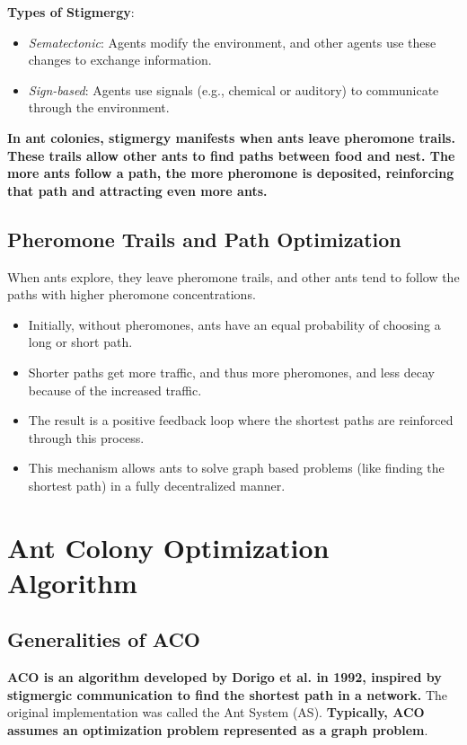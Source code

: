 \textbf{Types of Stigmergy}:
    \begin{itemize}
        \item \textit{Sematectonic}: Agents modify the environment, and other agents use these changes to exchange information.
        \item \textit{Sign-based}: Agents use signals (e.g., chemical or auditory) to communicate through the environment.
    \end{itemize}
    \textbf{In ant colonies, stigmergy manifests when ants leave pheromone trails. These trails allow other ants to find paths between food and nest. The more ants follow a path, the more pheromone is deposited, reinforcing that path and attracting even more ants.}

\subsection*{Pheromone Trails and Path Optimization}
When ants explore, they leave pheromone trails, and other ants tend to follow the paths with higher pheromone concentrations.
\begin{itemize}
    \item Initially, without pheromones, ants have an equal probability of choosing a long or short path.
    \item Shorter paths get more traffic, and thus more pheromones, and less decay because of the increased traffic.
    \item The result is a positive feedback loop where the shortest paths are reinforced through this process.
    \item This mechanism allows ants to solve graph based problems (like finding the shortest path) in a fully decentralized manner.
\end{itemize}
\section{Ant Colony Optimization Algorithm}
\subsection*{Generalities of ACO}
\textbf{ACO is an algorithm developed by Dorigo et al. in 1992, inspired by stigmergic communication to find the shortest path in a network.}  The original implementation was called the Ant System (AS). \textbf{Typically, ACO assumes an optimization problem represented as a graph problem}.

